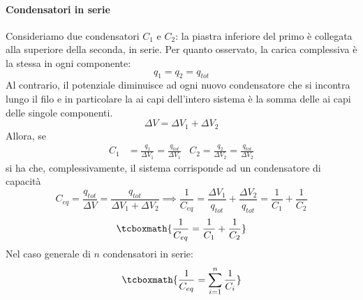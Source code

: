 \paragraph{Condensatori in serie}
Consideriamo due condensatori $C_1$ e $C_2$: la piastra inferiore del primo è collegata alla superiore della seconda, in serie.
Per quanto osservato, la carica complessiva è la stessa in ogni componente:
\begin{equation*}
	q_1=q_2=q_{tot}
\end{equation*}
Al contrario, il potenziale diminuisce ad ogni nuovo condensatore che si incontra lungo il filo e in particolare la \ddp ai capi dell'intero sistema è la somma delle \ddp ai capi delle singole componenti.
\begin{equation*}
	\Delta V=\Delta V_1+\Delta V_2
\end{equation*}
Allora, se
\begin{align*}
	C_1&=\frac{q_1}{\Delta V_1}=\frac{q_{tot}}{\Delta V_1} & C_2=\frac{q_2}{\Delta V_2}=\frac{q_{tot}}{\Delta V_2}
\end{align*}
si ha che, complessivamente, il sistema corrisponde ad un condensatore di capacità
\begin{equation*}
	C_{eq}=\frac{q_{tot}}{\Delta V}=\frac{q_{tot}}{\Delta V_1+\Delta V_2}\implies \frac{1}{C_{eq}}=\frac{\Delta V_1}{q_{tot}}+\frac{\Delta V_2}{q_{tot}}=\frac{1}{C_1}+\frac{1}{C_2}
\end{equation*}
\begin{equation}
	\tcboxmath{\frac{1}{C_{eq}}=\frac{1}{C_1}+\frac{1}{C_2}}
\end{equation}
Nel caso generale di $n$ condensatori in serie:
\begin{equation}
	\tcboxmath{\frac{1}{C_{eq}}=\sum_{i=1}^{n}\frac{1}{C_i}}
\end{equation}
